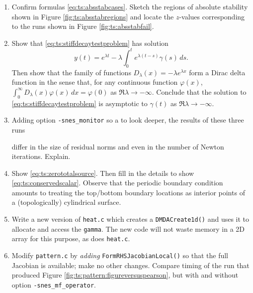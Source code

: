 \begin{enumerate}
\item \label{exer:ts:absstabcases}  Confirm formulas \eqref{eq:ts:absstabcases}.  Sketch the regions of absolute stability shown in Figure \ref{fig:ts:absstabregions} and locate the $z$-values corresponding to the runs shown in Figure \ref{fig:ts:absstabfail}.

\item \label{exer:ts:stiffdecayasymptotic}  Show that \eqref{eq:ts:stiffdecaytestproblem} has solution
    $$y(t) = e^{\lambda t} - \lambda \int_0^t e^{\lambda (t-s)} \gamma(s)\,ds.$$
Then show that the family of functions $D_\lambda(x) = -\lambda e^{\lambda x}$ form a Dirac delta function \citep{Evans2010} in the sense that, for any continuous function $\varphi(x)$, $\int_{0}^\infty D_\lambda(x) \varphi(x)\,dx = \varphi(0)$ as $\Re\lambda \to -\infty$.  Conclude that the solution to \eqref{eq:ts:stiffdecaytestproblem} is asymptotic to $\gamma(t)$ as $\Re\lambda \to -\infty$.

\item \label{exer:ts:fdjacobian}   Adding option \texttt{-snes\_monitor} so a to look deeper, the results of these three runs
differ in the size of residual norms and even in the number of Newton iterations.  Explain.

\item \label{exer:ts:zerototalsource}  Show \eqref{eq:ts:zerototalsource}.  Then fill in the details to show \eqref{eq:ts:conservedscalar}.  Observe that the periodic boundary condition amounts to treating the top/bottom boundary locations as interior points of a (topologically) cylindrical surface.

\item \label{exer:ts:heatneumanndmda} Write a new version of \texttt{heat.c} which creates a \texttt{DMDACreate1d()} and uses it to allocate and access the \pVec \texttt{gamma}.  The new code will not waste memory in a 2D array for this purpose, as does \texttt{heat.c}.

\item \label{exer:ts:patternfulljacobian}  Modify \texttt{pattern.c} by \emph{adding} \texttt{FormRHSJacobianLocal()} so that the full Jacobian is available; make no other changes.  Compare timing of the run that produced Figure \ref{fig:ts:pattern:figureversuspearson}, but with and without option \texttt{-snes\_mf\_operator}.


\end{enumerate}
